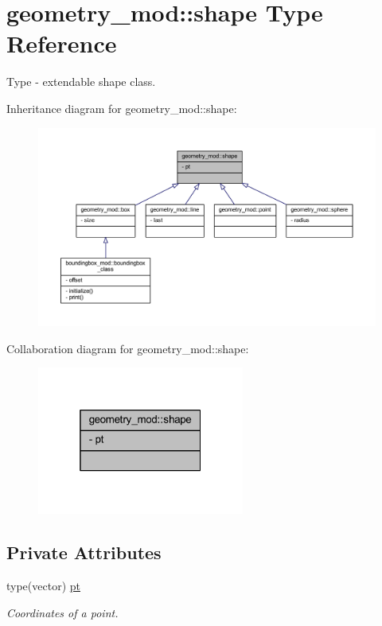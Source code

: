 \hypertarget{structgeometry__mod_1_1shape}{}\section{geometry\+\_\+mod\+:\+:shape Type Reference}
\label{structgeometry__mod_1_1shape}


Type -\/ extendable shape class.  




Inheritance diagram for geometry\+\_\+mod\+:\+:shape\+:
\nopagebreak
\begin{figure}[H]
\begin{center}
\leavevmode
\includegraphics[width=350pt]{structgeometry__mod_1_1shape__inherit__graph}
\end{center}
\end{figure}


Collaboration diagram for geometry\+\_\+mod\+:\+:shape\+:
\nopagebreak
\begin{figure}[H]
\begin{center}
\leavevmode
\includegraphics[width=193pt]{structgeometry__mod_1_1shape__coll__graph}
\end{center}
\end{figure}
\subsection*{Private Attributes}
\begin{DoxyCompactItemize}
\item 
type(vector) \mbox{\hyperlink{structgeometry__mod_1_1shape_a4c7824c0af103efbef53cbcacb9a5de0}{pt}}
\begin{DoxyCompactList}\small\item\em Coordinates of a point. \end{DoxyCompactList}\end{DoxyCompactItemize}


